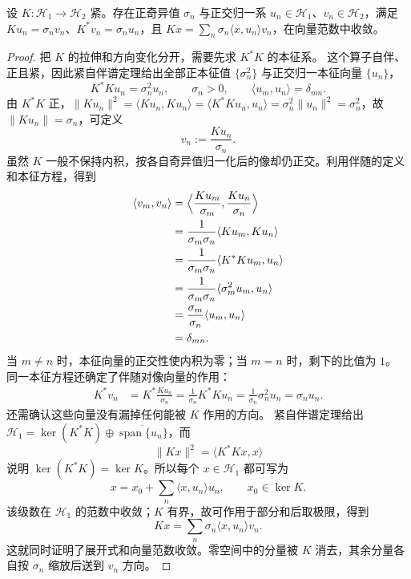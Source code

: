 \begin{theorem}[紧算子的奇异系统]
设 $K:\mathcal H_1\to\mathcal H_2$ 紧。存在正奇异值 $\sigma_n$ 与正交归一系 $u_n\in\mathcal H_1$、$v_n\in\mathcal H_2$，满足 $Ku_n=\sigma_nv_n$、$K^*v_n=\sigma_nu_n$，且 $Kx=\sum_n\sigma_n\langle x,u_n\rangle v_n$，在向量范数中收敛。
\end{theorem}
\begin{proof}
把 $K$ 的拉伸和方向变化分开，需要先求 $K^*K$ 的本征系。
这个算子自伴、正且紧，因此紧自伴谱定理给出全部正本征值 $\{\sigma_n^2\}$ 与正交归一本征向量 $\{u_n\}$，
\begin{equation*}
K^*Ku_n=\sigma_n^2u_n,
\qquad
\sigma_n>0,
\qquad
\langle u_m,u_n\rangle=\delta_{mn}.
\end{equation*}
由 $K^*K$ 正，$\|Ku_n\|^2=\langle Ku_n,Ku_n\rangle=\langle K^*Ku_n,u_n\rangle=\sigma_n^2\|u_n\|^2=\sigma_n^2$，故 $\|Ku_n\|=\sigma_n$，可定义
\begin{equation*}
v_n:=\frac{Ku_n}{\sigma_n}.
\end{equation*}
虽然 $K$ 一般不保持内积，按各自奇异值归一化后的像却仍正交。利用伴随的定义和本征方程，得到
\begin{align*}
\langle v_m,v_n\rangle
&=\Bigl\langle\frac{Ku_m}{\sigma_m},\frac{Ku_n}{\sigma_n}\Bigr\rangle\\
&=\frac{1}{\sigma_m\sigma_n}\langle Ku_m,Ku_n\rangle\\
&=\frac{1}{\sigma_m\sigma_n}\langle K^*Ku_m,u_n\rangle\\
&=\frac{1}{\sigma_m\sigma_n}\langle\sigma_m^2u_m,u_n\rangle\\
&=\frac{\sigma_m}{\sigma_n}\langle u_m,u_n\rangle\\
&=\delta_{mn}.
\end{align*}
当 $m\ne n$ 时，本征向量的正交性使内积为零；当 $m=n$ 时，剩下的比值为 $1$。
同一本征方程还确定了伴随对像向量的作用：
\begin{align*}
K^*v_n
&=K^*\frac{Ku_n}{\sigma_n}
=\frac{1}{\sigma_n}K^*Ku_n
=\frac{1}{\sigma_n}\sigma_n^2u_n
=\sigma_nu_n.
\end{align*}
还需确认这些向量没有漏掉任何能被 $K$ 作用的方向。
紧自伴谱定理给出 $\mathcal H_1=\ker(K^*K)\oplus\overline{\operatorname{span}\{u_n\}}$，而
\begin{equation*}
\|Kx\|^2=\langle K^*Kx,x\rangle
\end{equation*}
说明 $\ker(K^*K)=\ker K$。所以每个 $x\in\mathcal H_1$ 都可写为
\[
x=x_0+\sum_n\langle x,u_n\rangle u_n,\qquad x_0\in\ker K.
\]
该级数在 $\mathcal H_1$ 的范数中收敛；$K$ 有界，故可作用于部分和后取极限，得到
\[
Kx=\sum_n\sigma_n\langle x,u_n\rangle v_n.
\]
这就同时证明了展开式和向量范数收敛。零空间中的分量被 $K$ 消去，其余分量各自按 $\sigma_n$ 缩放后送到 $v_n$ 方向。
\end{proof}


